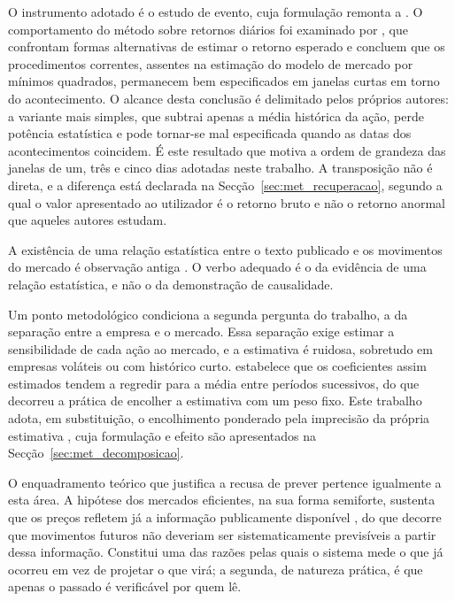 O instrumento adotado é o estudo de evento, cuja formulação remonta a
\textcite{fama1969adjustment}. O comportamento do método sobre retornos diários foi examinado por
\textcite{brown1985daily}, que confrontam formas alternativas de estimar o retorno esperado e
concluem que os procedimentos correntes, assentes na estimação do modelo de mercado por mínimos
quadrados, permanecem bem especificados em janelas curtas em torno do acontecimento. O alcance
desta conclusão é delimitado pelos próprios autores: a variante mais simples, que subtrai apenas a
média histórica da ação, perde potência estatística e pode tornar-se mal especificada quando as
datas dos acontecimentos coincidem. É este resultado que motiva a ordem de grandeza das
janelas de um, três e cinco dias adotadas neste trabalho. A transposição não é direta, e a diferença
está declarada na
Secção~\ref{sec:met_recuperacao}, segundo a qual o valor apresentado ao utilizador é o retorno bruto
e não o retorno anormal que aqueles autores estudam.

A existência de uma relação estatística entre o texto publicado e os movimentos do mercado é
observação antiga \autocite{tetlock2007media}. O verbo adequado é o da evidência de uma relação
estatística, e não o da demonstração de causalidade.

Um ponto metodológico condiciona a segunda pergunta do trabalho, a da separação entre a empresa e o
mercado. Essa separação exige estimar a sensibilidade de cada ação ao mercado, e a estimativa é
ruidosa, sobretudo em empresas voláteis ou com histórico curto. \textcite{blume1971risk} estabelece
que os coeficientes assim estimados tendem a regredir para a média entre períodos sucessivos, do
que decorreu a prática de encolher a estimativa com um peso fixo. Este trabalho adota, em
substituição, o encolhimento ponderado pela imprecisão da própria estimativa \autocite{vasicek1973beta}, cuja
formulação e efeito são apresentados na Secção~\ref{sec:met_decomposicao}.

O enquadramento teórico que justifica a recusa de prever pertence igualmente a esta área. A
hipótese dos mercados eficientes, na sua forma semiforte, sustenta que os preços refletem já a
informação publicamente disponível \autocite{fama1970efficient}, do que decorre que movimentos
futuros não deveriam ser sistematicamente previsíveis a partir dessa informação. Constitui uma das
razões pelas quais o sistema mede o que já ocorreu em vez de projetar o que virá; a segunda, de
natureza prática, é que apenas o passado é verificável por quem lê.


